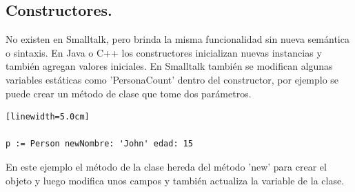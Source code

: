 \documentclass[10pt,journal,compsoc]{IEEEtran}
\begin{document}
\subsection{Constructores.}
No existen en Smalltalk, pero brinda la misma funcionalidad sin nueva sem\'antica o sintaxis. En Java o C++ los constructores inicializan nuevas instancias y tambi\'en agregan valores iniciales. En Smalltalk tambi\'en se modifican algunas variables est\'aticas como 'PersonaCount' dentro del constructor, por ejemplo se puede crear un m\'etodo de clase que tome dos par\'ametros.
\begin{lstlisting}[language=Smalltalk, caption = {Ejemplo para crear una instancia de la clase Persona.}][linewidth=5.0cm]

p := Person newNombre: 'John' edad: 15

\end{lstlisting}
En este ejemplo el m\'etodo de la clase hereda del m\'etodo 'new' para crear el objeto y luego modifica unos campos y tambi\'en actualiza la variable de la clase.
\end{document}
